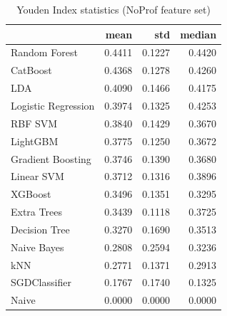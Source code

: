 \begin{table}
\caption{Youden Index statistics (NoProf feature set)}
\label{tab:youden_NoProf_stats}
\begin{tabular}{lrrr}
\toprule
 & mean & std & median \\
\midrule
Random Forest & 0.4411 & 0.1227 & 0.4420 \\
CatBoost & 0.4368 & 0.1278 & 0.4260 \\
LDA & 0.4090 & 0.1466 & 0.4175 \\
Logistic Regression & 0.3974 & 0.1325 & 0.4253 \\
RBF SVM & 0.3840 & 0.1429 & 0.3670 \\
LightGBM & 0.3775 & 0.1250 & 0.3672 \\
Gradient Boosting & 0.3746 & 0.1390 & 0.3680 \\
Linear SVM & 0.3712 & 0.1316 & 0.3896 \\
XGBoost & 0.3496 & 0.1351 & 0.3295 \\
Extra Trees & 0.3439 & 0.1118 & 0.3725 \\
Decision Tree & 0.3270 & 0.1690 & 0.3513 \\
Naive Bayes & 0.2808 & 0.2594 & 0.3236 \\
kNN & 0.2771 & 0.1371 & 0.2913 \\
SGDClassifier & 0.1767 & 0.1740 & 0.1325 \\
Naive & 0.0000 & 0.0000 & 0.0000 \\
\bottomrule
\end{tabular}
\end{table}
